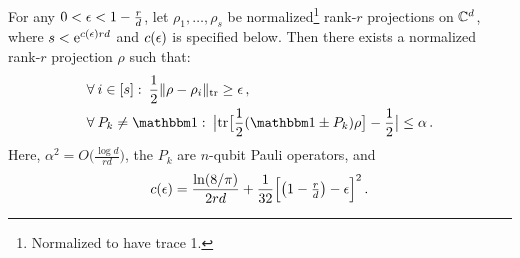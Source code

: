 \begin{lemma}\label{randomized}
	For any $0< \epsilon < 1-\frac{r}{d}$, let $\rho_1, \dots, \rho_s$ be normalized\footnote{Normalized to have trace 1.} rank-$r$ projections on $\mathbb{C}^d$, where $s< \mathrm{e}^{c(\epsilon) rd}$ and $c(\epsilon)$ is specified below. Then there exists a normalized rank-$r$ projection $\rho$ such that:
	\begin{eqnarray}\label{eqn:farApart}
		&\forall\>i \in [s]:\> \frac{1}{2}\|\rho - \rho_i\|_{\tr} \geq \eps \,,\\
		\label{eqn:smallPauli}
		&\forall\>P_k \neq \Id:\> \bigl|\tr\bigl[\frac12(\Id\pm P_k) \rho\bigr]-\frac12\bigr| \leq \alpha \,.
	\end{eqnarray}
	Here, $\alpha^2 = O\bigr(\tfrac{\log d}{rd}\bigr)$, the $P_k$ are $n$-qubit Pauli operators, and 
	\begin{align*}
		c(\epsilon) = \frac{\ln(8/\pi)}{2 r d}+ \frac{1}{32}\Bigl[\bigl(1-\tfrac{r}{d}\bigr)-\epsilon\Bigr]^2\,.
	\end{align*}
\end{lemma}

